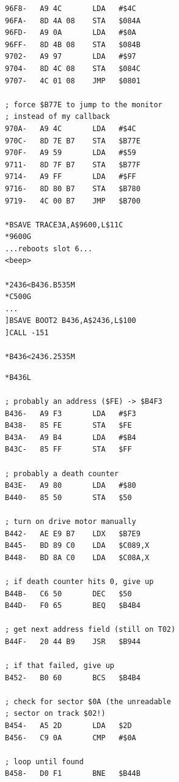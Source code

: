\documentclass{article}
\begin{document}
\begin{verbatim}
96F8-   A9 4C       LDA   #$4C
96FA-   8D 4A 08    STA   $084A
96FD-   A9 0A       LDA   #$0A
96FF-   8D 4B 08    STA   $084B
9702-   A9 97       LDA   #$97
9704-   8D 4C 08    STA   $084C
9707-   4C 01 08    JMP   $0801

; force $B77E to jump to the monitor
; instead of my callback
970A-   A9 4C       LDA   #$4C
970C-   8D 7E B7    STA   $B77E
970F-   A9 59       LDA   #$59
9711-   8D 7F B7    STA   $B77F
9714-   A9 FF       LDA   #$FF
9716-   8D 80 B7    STA   $B780
9719-   4C 00 B7    JMP   $B700

*BSAVE TRACE3A,A$9600,L$11C
*9600G
...reboots slot 6...
<beep>

*2436<B436.B535M
*C500G
...
]BSAVE BOOT2 B436,A$2436,L$100
]CALL -151

*B436<2436.2535M
\end{verbatim}

\newpage

\begin{verbatim}
*B436L

; probably an address ($FE) -> $B4F3
B436-   A9 F3       LDA   #$F3
B438-   85 FE       STA   $FE
B43A-   A9 B4       LDA   #$B4
B43C-   85 FF       STA   $FF

; probably a death counter
B43E-   A9 80       LDA   #$80
B440-   85 50       STA   $50

; turn on drive motor manually
B442-   AE E9 B7    LDX   $B7E9
B445-   BD 89 C0    LDA   $C089,X
B448-   BD 8A C0    LDA   $C08A,X

; if death counter hits 0, give up
B44B-   C6 50       DEC   $50
B44D-   F0 65       BEQ   $B4B4

; get next address field (still on T02)
B44F-   20 44 B9    JSR   $B944

; if that failed, give up
B452-   B0 60       BCS   $B4B4

; check for sector $0A (the unreadable
; sector on track $02!)
B454-   A5 2D       LDA   $2D
B456-   C9 0A       CMP   #$0A

; loop until found
B458-   D0 F1       BNE   $B44B
\end{verbatim}

\newpage
\end{document}
